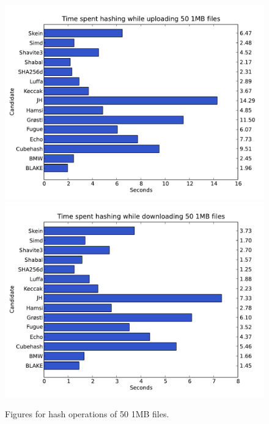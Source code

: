 \documentclass[english,12pt,a4paper]{book}
\begin{document}
\begin{figure}[h!]
    \centering
    \includegraphics[width=0.9\columnwidth]
        {graphs/Timespenthashingwhileuploading501MBfiles.pdf}
    \includegraphics[width=0.9\columnwidth]
        {graphs/Timespenthashingwhiledownloading501MBfiles.pdf}
    \caption{Figures for hash operations of 50 1MB files.}
    \label{fig:graph:501mb}
\end{figure}
\end{document}
